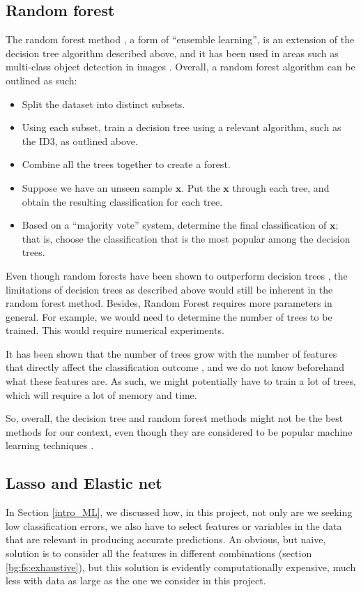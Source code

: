 \documentclass[12pt, twoside, a4paper]{report}
\begin{document}
\subsection{Random forest}
The random forest method \cite{RefWorks:101}, a form of ``ensemble learning'', is an extension of the decision tree algorithm described above, and it has been used in areas such as multi-class object detection in images \cite{RefWorks:100}. Overall, a random forest algorithm can be outlined as such:
\begin{itemize}
\item Split the dataset into distinct subsets.
\item Using each subset, train a decision tree using a relevant algorithm, such as the ID3, as outlined above.
\item Combine all the trees together to create a forest.
\item Suppose we have an unseen sample $\boldsymbol x$.  Put the $\boldsymbol x$ through each tree, and obtain the resulting classification for each tree.
\item Based on a ``majority vote'' system, determine the final classification of $\boldsymbol x$; that is, choose the classification that is the most popular among the decision trees.
\end{itemize}

Even though random forests have been shown to outperform decision trees \cite{RefWorks:103}, the limitations of decision trees as described above would still be inherent in the random forest method. Besides, Random Forest requires more parameters in general. For example, we would need to determine the number of trees to be trained. This would require numerical experiments.

It has been shown that the number of trees grow with the number of features that directly affect the classification outcome \cite{RefWorks:102}, and we do not know beforehand what these features are. As such, we might potentially have to train a lot of trees, which will require a lot of memory and time.

So, overall, the decision tree and random forest methods might not be the best methods for our context, even though they are considered to be popular machine learning techniques \cite{RefWorks:103}.

\subsection{Lasso and Elastic net}
In Section \ref{intro_ML}, we discussed how, in this project, not only are we seeking low classification errors, we also have to select features or variables in the data that are relevant in producing accurate predictions. An obvious, but naive, solution is to consider all the features in different combinations (section \ref{bg:fs:exhaustive}), but this solution is evidently computationally expensive, much less with data as large as the one we consider in this project.
\end{document}
